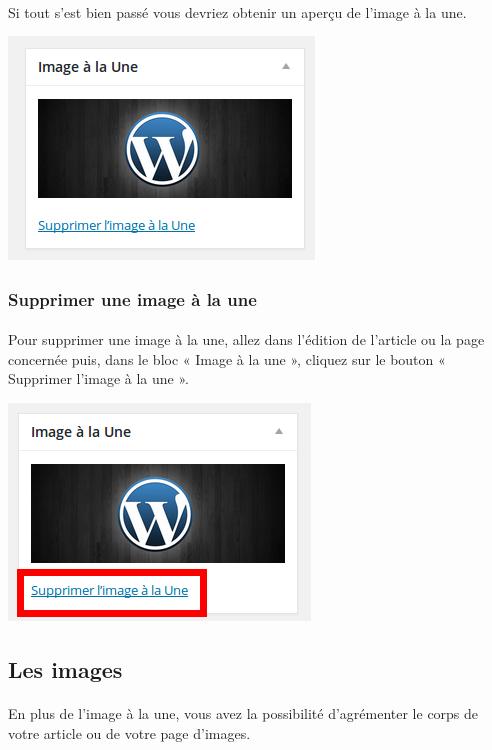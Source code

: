 \documentclass[10pt,a4paper]{article}
\begin{document}
\paragraph{}Si tout s'est bien passé vous devriez obtenir un aperçu de l'image à la une.
\begin{center}
\includegraphics[scale=0.3]{img/0100.png}
\end{center}
\subsubsection{Supprimer une image à la une}
\paragraph{}Pour supprimer une image à la une, allez dans l'édition de l'article ou la page concernée puis, dans le bloc « Image à la une », cliquez sur le bouton « Supprimer l'image à la une ».
\begin{center}
\includegraphics[scale=0.3]{img/0101.png}
\end{center}
\newpage
\subsection{Les images}
\paragraph{}En plus de l'image à la une, vous avez la possibilité d'agrémenter le corps de votre article ou de votre page d'images.
\end{document}
